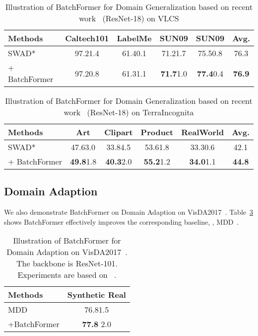 \documentclass[10pt,twocolumn,letterpaper]{article}
\begin{document}
\begin{table}[tp]
\small
\setlength\tabcolsep{2.5pt}
\caption{Illustration of BatchFormer for Domain Generalization based on recent work~\cite{cha2021swad} (ResNet-18) on VLCS }
\label{table:dg_swad_vlcs}
\centering
\begin{tabular}{@{}lccccc@{}}
\hline
Methods  & Caltech101 & LabelMe & SUN09 & SUN09 & Avg.  \\
\hline
SWAD*~\cite{cha2021swad} & 97.21.4 & 61.40.1 & 71.21.7 & 75.50.8 & 76.3  \\
 + BatchFormer & 97.20.8 & 61.31.1 & {\bf 71.7}1.0 & {\bf 77.4}0.4 & {\bf 76.9} \\

\hline
\end{tabular}
\end{table}

\begin{table}[tp]
\small
\setlength\tabcolsep{2.5pt}
\caption{Illustration of BatchFormer for Domain Generalization based on recent work~\cite{cha2021swad} (ResNet-18) on TerraIncognita }
\label{table:dg_swad_terra}
\centering
\begin{tabular}{@{}lccccc@{}}
\hline
Methods  &  Art   & Clipart   & Product   & RealWorld & Avg.  \\
\hline
SWAD*~\cite{cha2021swad} & 47.63.0 & 33.84.5 & 53.61.8 & 33.30.6 & 42.1 \\
 + BatchFormer & {\bf 49.8}1.8 & {\bf 40.3}2.0 & {\bf 55.2}1.2 & {\bf 34.0}1.1 & {\bf 44.8}\\

\hline
\end{tabular}
\end{table}


\subsection{Domain Adaption}

We also demonstrate BatchFormer on Domain Adaption on VisDA2017~\cite{visda2017}. Table~\ref{table:da_visda2017} shows BatchFormer effectively improves the corresponding baseline, \ie, MDD~\cite{MDD}.

\begin{table}[tp]
\small

\caption{Illustration of BatchFormer for Domain Adaption on VisDA2017~\cite{visda2017}. The backbone is ResNet-101. Experiments are based on ~\cite{dalib}. }
\label{table:da_visda2017}
\centering
\begin{tabular}{@{}lc@{}}
\hline
Methods  & Synthetic  Real \\
\hline
MDD~\cite{MDD} & 76.81.5 \\
+BatchFormer & {\bf 77.8} 2.0 \\
\hline
\end{tabular}
\end{table}
\end{document}
